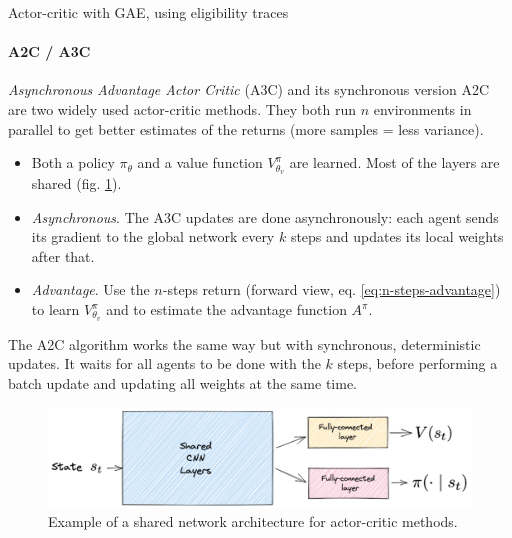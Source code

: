 \begin{algorithm}[H]
\DontPrintSemicolon
{}
\caption{Actor-critic with GAE, using eligibility traces}
\label{algo:gae-eligibility-traces}
\end{algorithm}


\paragraph{A2C / A3C}
\emph{Asynchronous Advantage Actor Critic} (A3C) \cite{mnih2016asynchronous} and its synchronous version A2C are two widely used actor-critic methods. They both run $n$ environments in parallel to get better estimates of the returns (more samples = less variance).
\begin{itemize}
    \item Both a policy $\pi_\theta$ and a value function $V^{\pi}_{\theta_v}$ are learned. Most of the layers are shared (fig. \ref{fig:actor-critic-architecture}).
    \item \emph{Asynchronous}. The A3C updates are done asynchronously: each agent sends its gradient to the global network every $k$ steps and updates its local weights after that.
    \item \emph{Advantage}. Use the $n$-steps return (forward view, eq. \ref{eq:n-steps-advantage}) to learn $V^\pi_{\theta_v}$ and to estimate the advantage function $A^\pi$.
\end{itemize}
The A2C algorithm works the same way but with synchronous, deterministic updates. It waits for all agents to be done with the $k$ steps, before performing a batch update and updating all weights at the same time.

\begin{figure}[H]
    \centering
    \includegraphics[width=0.8\linewidth]{figures/shared-actor-critic-network.png}
    \caption{Example of a shared network architecture for actor-critic methods.}
    \label{fig:actor-critic-architecture}
\end{figure}

